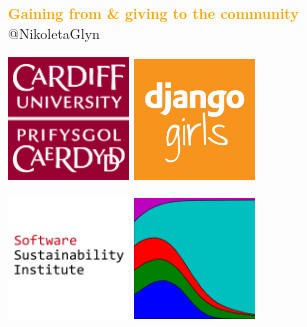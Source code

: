 \documentclass{beamer}
\begin{document}
\begin{frame}
    \begin{center}
        \LARGE{\textbf{\textcolor{orange}{Gaining from \& giving to the community}}} \\

        \vspace{1cm}
        \normalsize{@NikoletaGlyn}

    \end{center}
\end{frame}

\begin{frame}
    \begin{center}
    \includegraphics[width=0.24\textwidth]{static/cardiff_uni_logo.png}\hspace{6pt}
    \includegraphics[width=0.24\textwidth, height=0.245\textwidth]{static/django_girls.png}\vspace{10pt}

    \includegraphics[width=0.24\textwidth]{static/ssi-logo.png} \hspace{6pt}
    \includegraphics[width=0.24\textwidth]{static/axelrod-logo.png}

    \end{center}
\end{frame}
\end{document}
